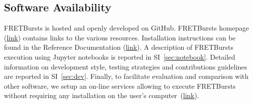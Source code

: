 \subsection{Software Availability}
FRETBursts is hosted and openly developed on GitHub. FRETBursts homepage 
(\href{http://tritemio.github.io/FRETBursts}{link})
contains links to the various resources. Installation instructions can be found in the
Reference Documentation (\href{http://fretbursts.readthedocs.org/en/latest/getting_started.html}{link}). 
A description of FRETBursts execution using Jupyter notebooks is reported 
in SI~\ref{sec:notebook}.
Detailed information on development style, testing strategies and 
contributions guidelines are reported in SI~\ref{sec:dev}.
Finally, to facilitate evaluation and comparison with other software, 
we setup an on-line services allowing to execute FRETBursts 
without requiring any installation on the user's computer~(\href{https://github.com/tritemio/FRETBursts_notebooks#run-online}{link}).

